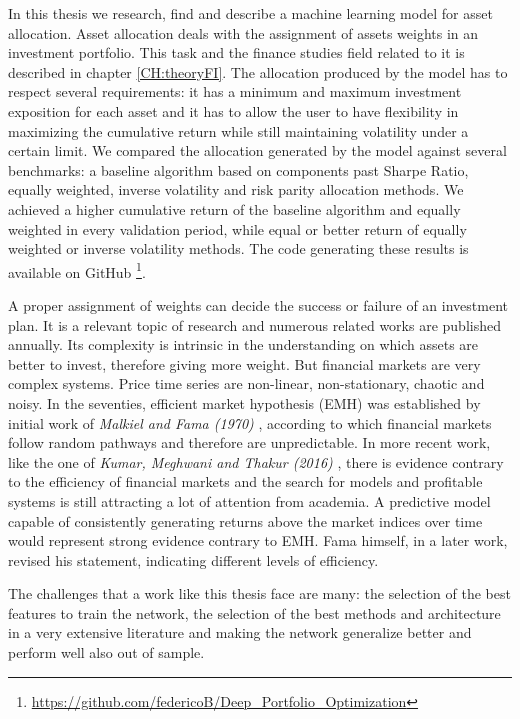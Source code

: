 In this thesis we research, find and describe a machine learning model for asset allocation. Asset allocation deals with the assignment of assets weights in an investment portfolio. This task and the finance studies field related to it is described in chapter \ref{CH:theoryFI}. The allocation produced by the model has to respect several requirements: it has a minimum and maximum investment exposition for each asset and it has to allow the user to have flexibility in maximizing the cumulative return while still maintaining volatility under a certain limit. We compared the allocation generated by the model against several benchmarks: a baseline algorithm based on components past Sharpe Ratio, equally weighted, inverse volatility and risk parity allocation methods. We achieved a higher cumulative return of the baseline algorithm and equally weighted in every validation period, while equal or better return of equally weighted or inverse volatility methods. The code generating these results is available on GitHub \footnote{\url{https://github.com/federicoB/Deep_Portfolio_Optimization}}.

\hfill \break

A proper assignment of weights can decide the success or failure of an investment plan. It is a relevant topic of research and numerous related works are published annually. Its complexity is intrinsic in the understanding on which assets are better to invest, therefore giving more weight. But financial markets are very complex systems. Price time series are non-linear, non-stationary, chaotic and noisy. In the seventies, efficient market hypothesis (EMH) was established by initial work of \textit{Malkiel and Fama (1970)} \cite{fama1970}, according to which financial markets follow random pathways and therefore are unpredictable. In more recent work, like the one of \textit{Kumar, Meghwani and Thakur (2016)} \cite{kumar2016}, there is evidence contrary to the efficiency of financial markets and the search for models and profitable systems is still attracting a lot of attention from academia. A predictive model capable of consistently generating returns above the market indices over time would represent strong evidence contrary to EMH. Fama himself, in a later work, revised his statement, indicating different levels of efficiency. 

\hfill \break

The challenges that a work like this thesis face are many: the selection of the best features to train the network, the selection of the best methods and architecture in a very extensive literature and making the network generalize better and perform well also out of sample. 

